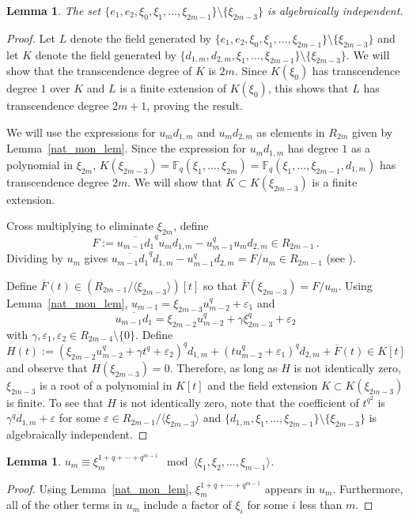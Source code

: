 \documentclass{amsart}
\newtheorem{lemma}[subsection]{Lemma}
\newcommand{\field}{\mathbb{F}}
\begin{document}
\begin{lemma} \label{Oodd-alg-ind} The set $\{e_1,e_2,\xi_0,\xi_1,\ldots,\xi_{2m-1}\}\setminus\{\xi_{2m-3}\}$ is algebraically independent.
\end{lemma}
\begin{proof} Let $L$ denote the field generated by $\{e_1,e_2,\xi_0,\xi_1,\ldots,\xi_{2m-1}\}\setminus\{\xi_{2m-3}\}$ and
let $K$ denote the field generated by $\{d_{1,m},d_{2,m},\xi_1,\ldots,\xi_{2m-1}\}\setminus\{\xi_{2m-3}\}$. 
We will show that the transcendence  degree of $K$ is $2m$.
Since $K(\xi_0)$ has transcendence  degree $1$ over $K$ and $L$ is a finite extension of $K(\xi_0)$,
this shows that $L$ has transcendence degree $2m+1$, proving the result.

We will use the expressions for $u_m d_{1,m}$ and $u_md_{2,m}$ as elements in $R_{2m}$ given by Lemma~\ref{nat_mon_lem}.
Since the expression for $u_m d_{1,m}$ has degree $1$ as a polynomial in $\xi_{2m}$, 
$K(\xi_{2m-3})=\field_q(\xi_1,\ldots,\xi_{2m})=\field_q(\xi_1,\ldots,\xi_{2m-1},d_{1,m})$
has transcendence degree $2m$. We will show that $K\subset K(\xi_{2m-3})$ is a finite extension.

Cross multiplying to eliminate $\xi_{2m}$, define 
    $$
        F:=\overline{u_{m-1} d_1}^q u_m d_{1,m} -u_{m-1}^q u_m d_{2,m}\in R_{2m-1}\, .
    $$
Dividing by $u_m$ gives $\overline{u_{m-1} d_1}^q d_{1,m} -u_{m-1}^q d_{2,m}=F/u_m\in R_{2m-1}$ (see \cite[Lemma 8.3.5]{benson-polyinvafinigrou:93}).

Define $\overline{F}(t)\in(R_{2m-1}/\langle\xi_{2m-3}\rangle)[t]$ so that $\overline{F}(\xi_{2m-3})=F/u_m$.
Using Lemma~\ref{nat_mon_lem}, $u_{m-1}=\xi_{2m-3}u_{m-2}^q+\varepsilon_1$ and
$$\overline{u_{m-1}d_1}=\xi_{2m-2}u_{m-2}^q+\gamma\xi_{2m-3}^q+\varepsilon_2$$
with $\gamma,\varepsilon_1,\varepsilon_2\in R_{2m-4}\setminus \{0\}$.
Define
$$H(t):=(\xi_{2m-2}u_{m-2}^q+\gamma t^q+\varepsilon_2)^qd_{1,m}+(t u_{m-2}^q+\varepsilon_1)^qd_{2,m}+\overline{F}(t)\in K[t]$$
and observe that $H(\xi_{2m-3})=0$. Therefore, as long as $H$ is not identically zero, $\xi_{2m-3}$ is a root of a polynomial in $K[t]$ and
the field extension $K\subset K(\xi_{2m-3})$ is finite. To see that $H$ is not identically zero, note that the coefficient of $t^{q^2}$
is $\gamma^qd_{1,m}+\varepsilon$ for some 
$\varepsilon\in R_{2m-1}/\langle\xi_{2m-3}\rangle$ and
$\{d_{1,m},\xi_1,\ldots,\xi_{2m-1}\}\setminus\{\xi_{2m-3}\}$ is algebraically independent.
\end{proof}

\begin{lemma}\label{um-lt-lem} $u_m\equiv \xi_m^{1+q+\cdots+q^{m-1}} \mod{\langle \xi_1,\xi_2,\ldots,\xi_{m-1}\rangle}$.
\end{lemma}
\begin{proof} Using Lemma~\ref{nat_mon_lem}, $\xi_m^{1+q+\cdots+q^{m-1}} $ appears in $u_m$.
Furthermore, all of the other terms in $u_m$ include a factor of $\xi_i$ for some $i$ less than $m$.
\end{proof}
\end{document}
